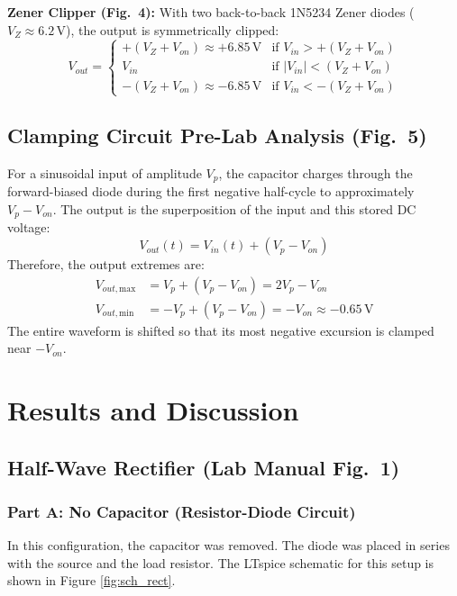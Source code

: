 \documentclass[12pt, letterpaper]{article}
\begin{document}
\textbf{Zener Clipper (Fig.~4):}
With two back-to-back 1N5234 Zener diodes ($V_Z \approx 6.2\,\text{V}$), the output is symmetrically clipped:
\[
V_{out} =
\begin{cases}
+(V_Z + V_{on}) \approx +6.85\,\text{V} & \text{if } V_{in} > +(V_Z + V_{on}) \\
V_{in} & \text{if } |V_{in}| < (V_Z + V_{on}) \\
-(V_Z + V_{on}) \approx -6.85\,\text{V} & \text{if } V_{in} < -(V_Z + V_{on})
\end{cases}
\]

\subsection{Clamping Circuit Pre-Lab Analysis (Fig.~5)}
For a sinusoidal input of amplitude $V_p$, the capacitor charges through the forward-biased diode during the first negative half-cycle to approximately $V_p - V_{on}$. The output is the superposition of the input and this stored DC voltage:
\[
V_{out}(t) = V_{in}(t) + (V_p - V_{on})
\]
Therefore, the output extremes are:
\begin{align*}
V_{out,\text{max}} &= V_p + (V_p - V_{on}) = 2V_p - V_{on} \\
V_{out,\text{min}} &= -V_p + (V_p - V_{on}) = -V_{on} \approx -0.65\,\text{V}
\end{align*}
The entire waveform is shifted so that its most negative excursion is clamped near $-V_{on}$.

\pagebreak
\section{Results and Discussion}

\subsection{Half-Wave Rectifier (Lab Manual Fig.~1)}
\subsubsection{Part A: No Capacitor (Resistor-Diode Circuit)}
In this configuration, the capacitor was removed. The diode was placed in series with the source and the load resistor. The LTspice schematic for this setup is shown in Figure \ref{fig:sch_rect}.
\end{document}
